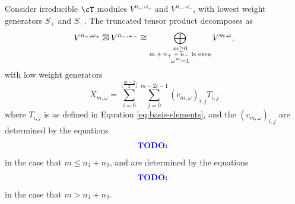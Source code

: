 \documentclass[12pt]{article}
\begin{document}
\begin{thm}
Consider irreducible $\cT$ modules $V^{n_+, \omega_+}$ and $V^{n_-, \omega_-}$, with lowest weight generators $S_+$ and $S_-$.
The truncated tensor product decomposes as
$$
V^{n_+, \omega_+} \boxtimes V^{n_-, \omega_-} 
\cong 
\bigoplus_{\substack{m \geq 0 \\ \text{$m + n_+  + n_-$ is even} \\ \omega^m = 1}} V^{m, \omega},
$$
with low weight generators 
$$
X_{m, \omega} 
= 
\sum_{i=0}^{\lfloor\frac{m-2}{2}\rfloor}
\sum_{j=0}^{m- 2i - 1} 
(c_{m,\omega})_{i,j} T_{i,j}
$$
where $T_{i,j}$ is as defined in Equation \eqref{eq:basis-elements}, and the $(c_{m,\omega})_{i,j}$ are determined by the equations
\begin{align*}
\textcolor{blue}{\textbf{TODO: }}
\end{align*}
in the case that $m \leq n_1 + n_2$, and are determined by the equations
\begin{align*}
\textcolor{blue}{\textbf{TODO: }}
\end{align*}
in the case that $m > n_1 + n_2$.
\end{thm}
\end{document}
